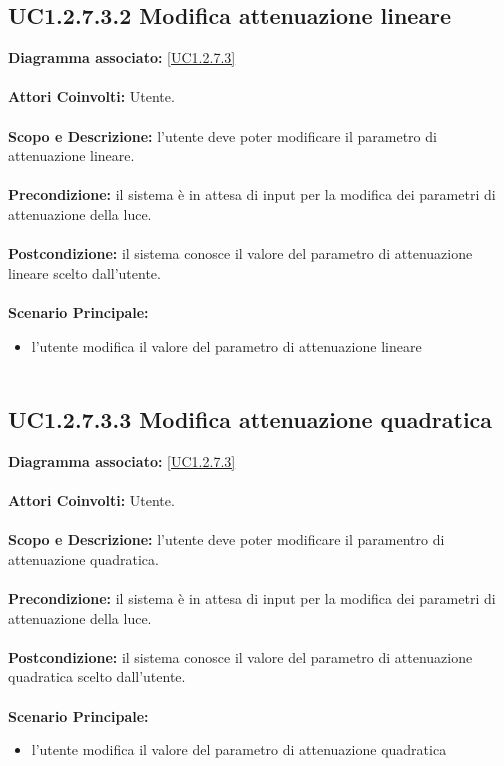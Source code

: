 \subsection{UC1.2.7.3.2 Modifica attenuazione lineare}
\textbf{Diagramma associato:}
\ref{UC1.2.7.3} \\ \\
\textbf{Attori Coinvolti:}
Utente. \\ \\
\textbf{Scopo e Descrizione:}
l'utente deve poter modificare il parametro di attenuazione lineare. \\ \\
\textbf{Precondizione:}
il sistema è in attesa di input per la modifica dei parametri di attenuazione della luce. \\ \\
\textbf{Postcondizione:}
il sistema conosce il valore del parametro di attenuazione lineare scelto dall'utente. \\ \\
\textbf{Scenario Principale:}
\begin{itemize}
\item l'utente modifica il valore del parametro di attenuazione lineare
\\ \\ \end{itemize}


\subsection{UC1.2.7.3.3 Modifica attenuazione quadratica}
\textbf{Diagramma associato:}
\ref{UC1.2.7.3} \\ \\
\textbf{Attori Coinvolti:}
Utente. \\ \\
\textbf{Scopo e Descrizione:}
l'utente deve poter modificare il paramentro di attenuazione quadratica. \\ \\
\textbf{Precondizione:}
il sistema è in attesa di input per la modifica dei parametri di attenuazione della luce. \\ \\
\textbf{Postcondizione:}
il sistema conosce il valore del parametro di attenuazione quadratica scelto dall'utente. \\ \\
\textbf{Scenario Principale:}
\begin{itemize}
\item l'utente modifica il valore del parametro di attenuazione quadratica
\\ \\ \end{itemize}


